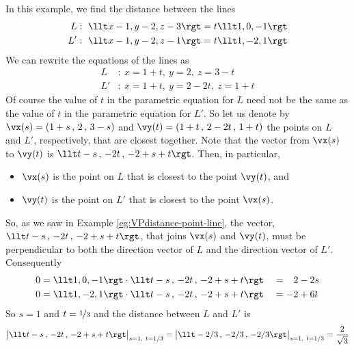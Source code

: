 \begin{eg}[Optional]\label{eg:VPdistance-line-line}
In this example, we find the distance between the lines
\begin{align*}
L&:\  \llt x-1,y-2,z-3\rgt = t \llt 1,0,-1 \rgt \\
L'&:\ \llt x-1,y-2,z-1\rgt = t \llt 1,-2,1 \rgt 
\end{align*}
We can rewrite the equations of the lines as
\begin{align*}
L&:\  x=1+t,\ y=2,\ z=3-t \\
L'&:\ x=1+t,\ y=2-2t,\ z=1+t 
\end{align*}
Of course the value of $t$ in the parametric equation for $L$ need not be 
the same as the value of $t$ in the parametric equation for $L'$. So 
let us denote by $\vx(s) = (1+s\,,\,2\,,\,3-s)$ and 
$\vy(t) = (1+t\,,\,2-2t\,,\,1+t)$ 
the points on $L$ and $L'$, respectively, that are closest together. 
Note that the vector from $\vx(s)$ to $\vy(t)$ is
$\llt  t-s\,,\,-2t\,,\,-2+s+t \rgt$. Then, in particular,
\begin{itemize}\itemsep1pt \parskip0pt 
\item
$\vx(s)$ is the point on $L$ that is closest to the point $\vy(t)$, and
\item
$\vy(t)$ is the point on $L'$ that is closest to the point $\vx(s)$.
\end{itemize}
So, as we saw in Example \ref{eg:VPdistance-point-line},
the vector, $\llt  t-s\,,\,-2t\,,\,-2+s+t \rgt$, that joins $\vx(s)$ and $\vy(t)$, must be perpendicular to both the direction vector of $L$ and the
direction vector of $L'$. Consequently
\begin{alignat*}{3}
0&= \llt 1,0,-1\rgt\cdot\llt  t-s\,,\,-2t\,,\,-2+s+t \rgt
 &&= \phantom{-}2-2s
\\
0&= \llt 1,-2,1\rgt\cdot\llt  t-s\,,\,-2t\,,\,-2+s+t \rgt
 &&=-2+6t
\end{alignat*}
So $s=1$ and $t=\nicefrac{1}{3}$ and the distance between $L$ and $L'$ is
\begin{align*}
\big|\llt  t-s\,,\,-2t\,,\,-2+s+t \rgt\big|_{s=1,\ t=1/3}
=\big|\llt -2/3\,,\,-2/3\,,\,-2/3 \rgt\big|_{s=1,\ t=1/3}
=\frac{2}{\sqrt{3}}
\end{align*}

\end{eg}


